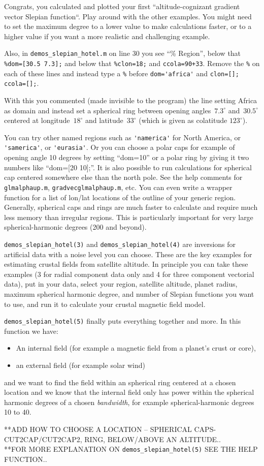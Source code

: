 \documentclass[11pt]{article}
\begin{document}
Congrats, you calculated and plotted your first ``altitude-cognizant
gradient vector Slepian function``. Play around with the other
examples. You might need to set the maximum degree to a lower value to
make calculations faster, or to a higher value if you want a more
realistic and challenging example.

Also, in \verb#demos_slepian_hotel.m# on line 30 you see ``\% Region'',
below that \verb+%dom=[30.5 7.3];+ and below that \verb+%clon=18;+ and
\verb#ccola=90+33#. Remove the \verb+%+ on each of these lines and
instead type a \verb+%+ before \verb+dom='africa'+ and
\verb+clon=[]; ccola=[];+.

With this you commented (made invisible to the program) the line
setting Africa as domain and instead set a spherical ring between
opening angles~$7.3^\circ$ and~$30.5^\circ$ centered at
longitude~$18^\circ$ and latitude~$33^\circ$ (which is given as
colatitude $123^\circ$).

You can try other named regions such as \verb#'namerica'# for North America,
or \verb#'samerica'#, or \verb#'eurasia'#. Or you can choose a polar caps for
example of opening angle 10 degrees by setting ``dom=10'' or a polar
ring by giving it two numbers like ``dom=[20 10];''. It is also
possible to run calculations for spherical cap centered somewhere else
than the north pole. See the help comments for \verb+glmalphaup.m+,
\verb+gradvecglmalphaup.m+, etc. You can even write a wrapper function
for a list of lon/lat locations of the outline of your generic
region. Generally, spherical caps and rings are much faster to
calculate and require much less memory than irregular regions. This is
particularly important for very large spherical-harmonic degrees (200
and beyond).

\verb+demos_slepian_hotel(3)+ and \verb+demos_slepian_hotel(4)+ are inversions for
artificial data with a noise level you can choose. These are the key
examples for estimating crustal fields from satellite altitude. In
principle you can take these examples (3 for radial component data
only and 4 for three component vectorial data), put in your data,
select your region, satellite altitude, planet radius, maximum
spherical harmonic degree, and number of Slepian functions you want to
use, and run it to calculate your crustal magnetic field model.

\verb+demos_slepian_hotel(5)+ finally puts everything together and
more. In this function we have:

\begin{itemize}
  \item An internal field (for example a
    magnetic field from a planet's crust or core),
  \item an external field (for example solar wind)
\end{itemize}
and we want to find the field within an spherical ring centered at a
chosen location and we know that the internal field only has power
within the spherical harmonic degrees of a chosen \emph{bandwidth},
for example spherical-harmonic degrees 10 to 40.

**ADD HOW TO CHOOSE A LOCATION -- SPHERICAL CAPS-CUT2CAP/CUT2CAP2, RING, BELOW/ABOVE AN ALTITUDE.. \\
**FOR MORE EXPLANATION ON \verb+demos_slepian_hotel(5)+ SEE THE HELP FUNCTION..
\end{document}
